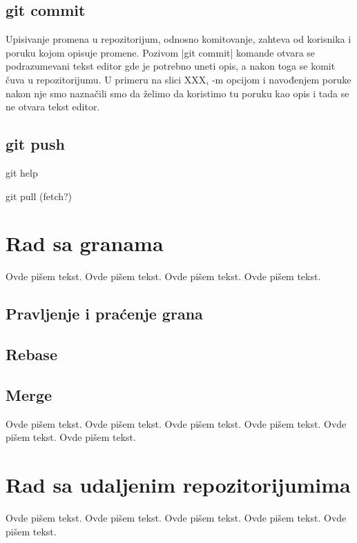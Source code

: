 \documentclass[a4paper]{article}
\begin{document}
{\subsection{git commit}
\label{subsec:git_commit}
Upisivanje promena u repozitorijum, odnosno komitovanje, zahteva od korisnika i poruku kojom opisuje promene. Pozivom |git commit| komande otvara se podrazumevani tekst editor gde je potrebno uneti opis, a nakon toga se komit čuva u repozitorijumu. U primeru na slici XXX, -m opcijom i navođenjem poruke nakon nje smo naznačili smo da želimo da koristimo tu poruku kao opis i tada se ne otvara tekst editor.


\subsection{git push}
\label{subsec:git_push}



git help

git pull (fetch?)

\section{Rad sa granama}
\label{sec:grane}

Ovde pišem tekst. 
Ovde pišem tekst. 
Ovde pišem tekst. 
Ovde pišem tekst. 

\subsection{Pravljenje i praćenje grana}
\label{subsec:pravljenje_grana}

\subsection{Rebase}
\label{subsec:rebase}

\subsection{Merge}
\label{subsec:merge}
Ovde pišem tekst. 
Ovde pišem tekst. 
Ovde pišem tekst. 
Ovde pišem tekst. 
Ovde pišem tekst. 
Ovde pišem tekst. 

\section{Rad sa udaljenim repozitorijumima}
\label{sec:udaljeni_repozitorijumi}

Ovde pišem tekst. 
Ovde pišem tekst. 
Ovde pišem tekst. 
Ovde pišem tekst. 
Ovde pišem tekst. 

}
\end{document}
